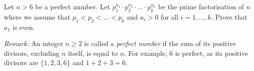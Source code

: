 Let $n > 6$ be a perfect number.
Let $p_1^{a_1}\cdot p_2^{a_2}\cdot \ldots\cdot p_k^{a_k}$ be the prime factorisation of $n$ where
we assume that $p_1 < p_2<\ldots<p_k$ and $a_i>0$ for all $i=1,\ldots, k$.
Prove that $a_1$ is even.

\emph{Remark:} An integer $n\geq 2$ is called a \emph{perfect number} if the sum of its positive divisors,
excluding $n$ itself, is equal to $n$.
For example, $6$ is perfect, as its positive divisors are $\{1, 2, 3, 6\}$ and $1+2+3 = 6$.
